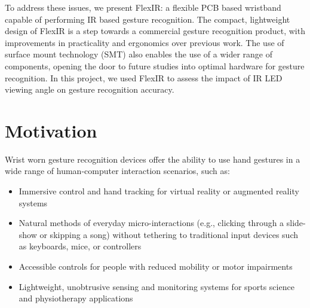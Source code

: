 \documentclass[ oneside,%
                    author={Jack Jarvis},
                    degree={BSc},
                     title={FlexIR: Flexible PCB Wristbands for Infrared Based Gesture Recognition},
                    unit={COMS30045},
                    subtitle={Investigating the Effect of LED Viewing Angle on Gesture Classification in Infrared Sensing Systems}]{dissertation}
\begin{document}

To address these issues, we present FlexIR: a flexible PCB based wristband capable of performing IR based gesture recognition. The compact, lightweight design of FlexIR is a step towards a commercial gesture recognition product, with improvements in practicality and ergonomics over previous work. The use of surface mount technology (SMT) also enables the use of a wider range of components, opening the door to future studies into optimal hardware for gesture recognition. In this project, we used FlexIR to assess the impact of IR LED viewing angle on gesture recognition accuracy.

\section{Motivation}

Wrist worn gesture recognition devices offer the ability to use hand gestures in a wide range of human-computer interaction scenarios, such as:
\begin{itemize}
    \item Immersive control and hand tracking for virtual reality or augmented reality systems
    \item Natural methods of everyday micro-interactions (e.g., clicking through a slide-show or skipping a song) without tethering to traditional input devices such as keyboards, mice, or controllers
    \item Accessible controls for people with reduced mobility or motor impairments
    \item Lightweight, unobtrusive sensing and monitoring systems for sports science and physiotherapy applications
\end{itemize}
\end{document}
